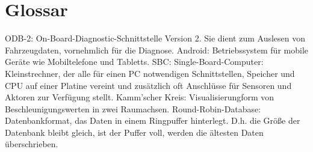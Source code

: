 \chapter{Glossar}
ODB-2: On-Board-Diagnostic-Schnittstelle Version 2. Sie dient zum Auslesen von Fahrzeugdaten, vornehmlich für die Diagnose.
Android: Betriebssystem für mobile Geräte wie Mobiltelefone und Tabletts.
SBC: Single-Board-Computer: Kleinstrechner, der alle für einen PC notwendigen Schnittstellen, Speicher und CPU auf einer Platine vereint und zusätzlich oft Anschlüsse für Sensoren und Aktoren zur Verfügung stellt.
Kamm’scher Kreis: Visualisierungform von Beschleunigungswerten in zwei Raumachsen.
Round-Robin-Database: Datenbankformat, das Daten in einem Ringpuffer hinterlegt. D.h. die Größe der Datenbank bleibt gleich, ist der Puffer voll, werden die ältesten Daten überschrieben.
